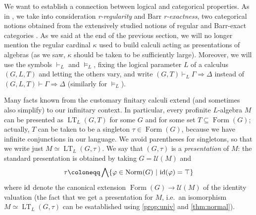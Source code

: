 \documentclass{article}
\theoremstyle{definition}
\DeclareMathOperator{\LT}{LT}
\DeclareMathOperator{\Formulas}{Form}
\DeclareMathOperator{\Norm}{Norm}
\newcommand{\id}{\textup{id}}
\begin{document}
We want to establish a connection between logical and categorical properties. As in \cite{Ghi-Zaw}, we  take into consideration \emph{r-regularity} and Barr \emph{r-exactness}, two categorical notions obtained from the extensively studied notions of regular and Barr-exact categories .
As we said at the end of the previous section, we will no longer mention the regular cardinal $\kappa$ used to build calculi acting as presentations of algebras (as we saw, $\kappa$ should be taken to be sufficiently large). Moreover, we will use the symbols $\vdash_L$ and $\vDash_L$, fixing the logical parameter $L$ of a calculus $(G,L,T)$ and letting the others vary, and write $(G,T) \vdash_L \Gamma \Rightarrow \Delta$ instead of $(G,L,T) \vdash \Gamma \Rightarrow \Delta$ (similarly for $\vDash_L$).


Many facts known from the customary finitary calculi extend (and sometimes also simplify) to our infinitary context. In particular, every profinite $L$-algebra $M$ can be presented as $\LT_L(G,T)$ for some $G$ and for some set $T \subseteq \Formulas(G)$; actually, $T$ can be taken to be a singleton $\tau \in \Formulas(G)$, because we have infinite conjunctions in our language. We avoid  parentheses for singletons, so that we write just $M\simeq \LT_L(G,\tau)$. We say that $(G,\tau)$ is a \emph{presentation} of $M$: the standard presentation is obtained by taking $G=\mathcal{U}(M)$ and 
$$\tau \coloneqq \bigwedge \{\varphi \in \Norm(G)\ \vert\ \id(\varphi) = \top\}$$
where $\id$  denote the canonical extension $\Formulas(G) \longrightarrow \mathcal{U}(M)$ of the identity valuation
(the fact that we get a presentation for $M$, i.e.\ an isomorphism $M\simeq \LT_L(G,\tau)$ can be esatablished using 
\cref{prop:univ} and \cref{thm:normal}).

\end{document}
